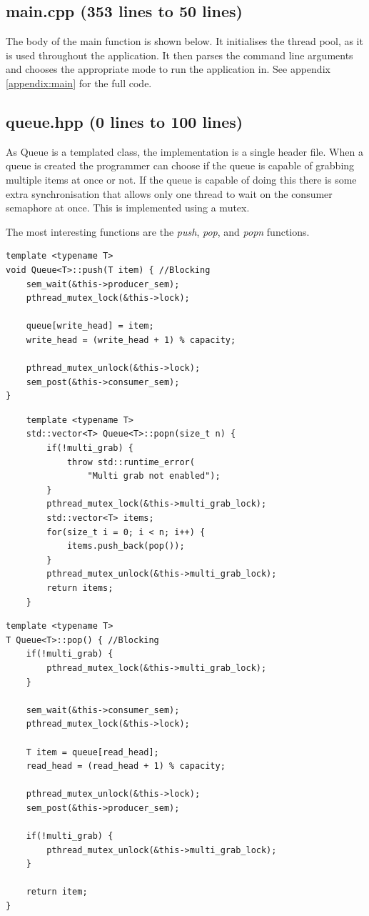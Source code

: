 \documentclass{article}
\begin{document}
\subsection{main.cpp (353 lines to 50 lines)}
The body of the main function is shown below. It initialises the thread pool, as it is used throughout the
application. It then parses the command line arguments and chooses the appropriate mode to run the application 
in. See appendix \ref{appendix:main} for the full code.


\subsection{queue.hpp (0 lines to 100 lines)}
As Queue is a templated class, the implementation is a single header file. When a queue is created the programmer 
can choose if the queue is capable of grabbing multiple items at once or not. If the queue is capable of doing this 
there is some extra synchronisation that allows only one thread to wait on the consumer semaphore at once. This is
implemented using a mutex. 

The most interesting functions are the \textit{push}, \textit{pop}, and \textit{popn} functions.

\begin{multicols}{2}
\begin{verbatim}
template <typename T>
void Queue<T>::push(T item) { //Blocking
    sem_wait(&this->producer_sem);
    pthread_mutex_lock(&this->lock);
    
    queue[write_head] = item;
    write_head = (write_head + 1) % capacity;
    
    pthread_mutex_unlock(&this->lock);
    sem_post(&this->consumer_sem);
}
\end{verbatim} 

\begin{verbatim}
    template <typename T>
    std::vector<T> Queue<T>::popn(size_t n) {
        if(!multi_grab) {
            throw std::runtime_error(
                "Multi grab not enabled");
        }
        pthread_mutex_lock(&this->multi_grab_lock);
        std::vector<T> items;
        for(size_t i = 0; i < n; i++) {
            items.push_back(pop());
        }
        pthread_mutex_unlock(&this->multi_grab_lock);
        return items;
    }
    \end{verbatim}

\begin{verbatim}
template <typename T>
T Queue<T>::pop() { //Blocking
    if(!multi_grab) {
        pthread_mutex_lock(&this->multi_grab_lock);
    }
    
    sem_wait(&this->consumer_sem);
    pthread_mutex_lock(&this->lock);

    T item = queue[read_head];
    read_head = (read_head + 1) % capacity;

    pthread_mutex_unlock(&this->lock);
    sem_post(&this->producer_sem);

    if(!multi_grab) {
        pthread_mutex_unlock(&this->multi_grab_lock);
    }
    
    return item;
}
\end{verbatim}
\end{multicols}
\end{document}
